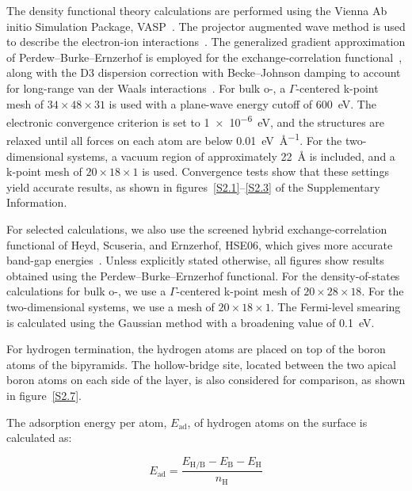 The density functional theory calculations are performed using the Vienna Ab initio Simulation Package, VASP~\cite{kresse1993ab,kresse1994ab,kresse1996efficiency,kresse1996efficient}.
The projector augmented wave method is used to describe the electron-ion interactions~\cite{kresse1999ultrasoft}.
The generalized gradient approximation of Perdew--Burke--Ernzerhof is employed for the exchange-correlation functional~\cite{perdew1996generalized},
along with the D3 dispersion correction with Becke--Johnson damping to account for long-range van der Waals interactions~\cite{becke2005density,grimme2010consistent,grimme2011effect}.
For bulk o-, a $\Gamma$-centered k-point mesh of $34 \times 48 \times 31$ is used with a plane-wave energy cutoff of \qty{600}{\electronvolt}.
The electronic convergence criterion is set to \qty{1e-6}{\electronvolt},
and the structures are relaxed until all forces on each atom are below \qty{0.01}{\electronvolt\per\angstrom}.
For the two-dimensional systems, a vacuum region of approximately \qty{22}{\angstrom} is included,
and a k-point mesh of $20 \times 18 \times 1$ is used.
Convergence tests show that these settings yield accurate results,
as shown in figures~\ref{S2.1}--\ref{S2.3} of the Supplementary Information.

For selected calculations,
we also use the screened hybrid exchange-correlation functional of Heyd, Scuseria, and Ernzerhof, HSE06,
which gives more accurate band-gap energies~\cite{sassnick2021electronic,krukau2006influence}.
Unless explicitly stated otherwise,
all figures show results obtained using the Perdew--Burke--Ernzerhof functional.
For the density-of-states calculations for bulk o-,
we use a $\Gamma$-centered k-point mesh of $20 \times 28 \times 18$.
For the two-dimensional systems,
we use a mesh of $20 \times 18 \times 1$.
The Fermi-level smearing is calculated using the Gaussian method with a broadening value of \qty{0.1}{\electronvolt}.

For hydrogen termination,
the hydrogen atoms are placed on top of the boron atoms of the bipyramids.
The hollow-bridge site,
located between the two apical boron atoms on each side of the layer,
is also considered for comparison,
as shown in figure~\ref{S2.7}.

The adsorption energy per atom, $E_{\mathrm{ad}}$, of hydrogen atoms on the surface is calculated as:

\begin{equation}
    E_{\mathrm{ad}} = \frac{E_{\mathrm{H/B}} - E_{\mathrm{B}} - E_{\mathrm{H}}}{n_{\mathrm{H}}}
\label{hydrogen_adsorption_energy}
\end{equation}

